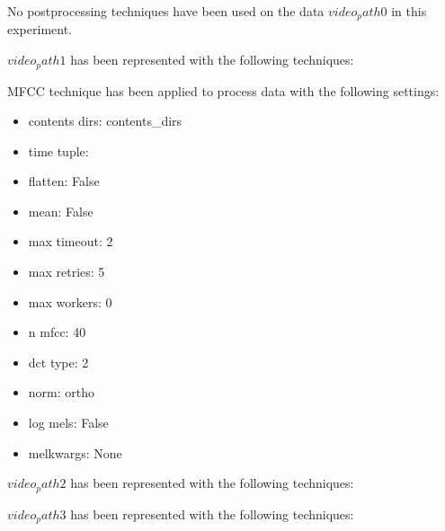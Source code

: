 \documentclass[11pt]{article}
\begin{document}
No postprocessing techniques have been used on the data $ video_path0 $ in this experiment.
\hfill\break
\hfill\break



$ video_path1 $  has been represented with the following techniques:
\hfill\break
\hfill\break



MFCC technique has been applied to process data with the following settings:
\begin{itemize}
    \item contents dirs: contents\_dirs
    \item time tuple:
    \item flatten: False
    \item mean: False
    \item max timeout: 2
    \item max retries: 5
    \item max workers: 0
    \item n mfcc: 40
    \item dct type: 2
    \item norm: ortho
    \item log mels: False
    \item melkwargs: None
\end{itemize}
\hfill\break
\hfill\break









$ video_path2 $  has been represented with the following techniques:
\hfill\break
\hfill\break












$ video_path3 $  has been represented with the following techniques:
\hfill\break
\hfill\break
\end{document}
